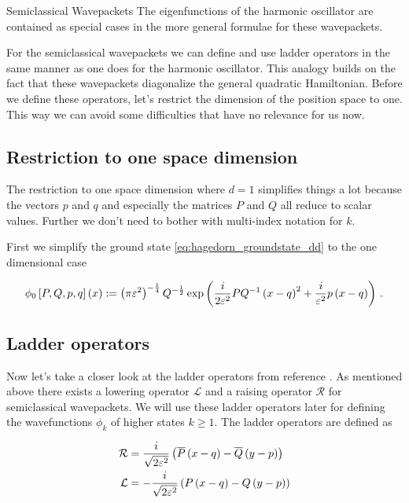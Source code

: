 \begin{chapter}{Semiclassical Wavepackets}
The eigenfunctions of the harmonic oscillator are contained as special cases
in the more general formulae for these wavepackets.

For the semiclassical wavepackets we can define and use ladder operators in the
same manner as one does for the harmonic oscillator. This analogy builds on the fact that
these wavepackets diagonalize the general quadratic Hamiltonian. Before we define
these operators, let's restrict the dimension of the position space to one. This
way we can avoid some difficulties that have no relevance for us now.

\subsection{Restriction to one space dimension}

The restriction to one space dimension where $d=1$ simplifies things a lot because
the vectors $p$ and $q$ and especially the matrices $P$ and $Q$ all reduce to scalar
values. Further we don't need to bother with multi-index notation for $k$.

First we simplify the ground state \eqref{eq:hagedorn_groundstate_dd} to the one
dimensional case

\begin{equation} \label{eq:hagedorn_groundstate_1d}
  \phi_0 \left[ P,Q,p,q \right] \left( x \right)
  :=
  \left(\pi\varepsilon^2\right)^{-\frac{1}{4}} Q^{-\frac{1}{2}}
  \exp \left(
      \frac{i}{2\varepsilon^2} PQ^{-1}\left(x-q\right)^2
      + \frac{i}{\varepsilon^2} p\left(x-q\right)
  \right) \,.
\end{equation}

\subsection{Ladder operators}

Now let's take a closer look at the ladder operators from reference \cite{H_ladder_operators}.
As mentioned above there exists a lowering operator $\mathcal{L}$ and a raising
operator $\mathcal{R}$ for semiclassical wavepackets. We will use these ladder
operators later for defining the wavefunctions $\phi_k$ of higher states $k \geq 1$.
The ladder operators are defined as

\begin{equation} \label{eq:definition_ladder_ops}
\begin{split}
  \mathcal{R} &= \frac{i}{\sqrt{2 \varepsilon^2}} \left( \overline{P} \left(x-q\right) - \overline{Q} \left(y-p\right) \right) \\
  \mathcal{L} &= - \frac{i}{\sqrt{2 \varepsilon^2}} \left( P \left(x-q\right) - Q \left(y-p\right) \right)
\end{split}
\end{equation}


\end{chapter}
